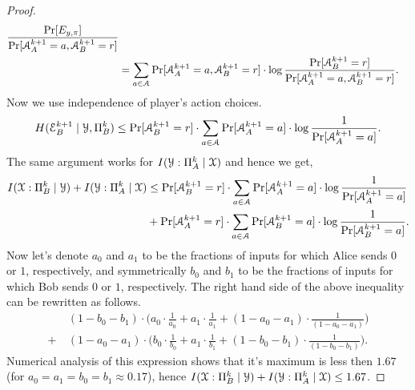 \begin{proof}
\begin{align*}
    \frac{\Pr[E_{y,\pi}]}{\Pr[\mathcal{A}^{k+1}_A = a , \mathcal{A}^{k+1}_B = r]}\\
    &= \sum_{a\in \mathcal{A}} 
    \Pr[\mathcal{A}^{k+1}_A = a , \mathcal{A}^{k+1}_B = r]\cdot \log 
    \frac{\Pr[\mathcal{A}^{k+1}_B = r]}{\Pr[\mathcal{A}^{k+1}_A = a , \mathcal{A}^{k+1}_B = r]}.
    \end{align*}
    Now we use independence of player's action choices.
    \begin{equation*}\label{eq:common-entropy-bound}
    H(\mathcal{E}^{k+1}_B\mid\mathcal{Y},\Pi^k_B)
    \le \Pr[\mathcal{A}^{k+1}_B = r] \cdot \sum_{a\in \mathcal{A}} 
    \Pr[\mathcal{A}^{k+1}_A = a] \cdot \log 
    \frac{1}{\Pr[\mathcal{A}^{k+1}_A = a]}.
    \end{equation*}
    The same argument works for $I(\mathcal{Y}:\Pi_A^k\mid\mathcal{X})$ and hence we get,
    \begin{align*}
    I(\mathcal{X}:\Pi_B^k\mid\mathcal{Y}) + I(\mathcal{Y}:\Pi_A^k\mid\mathcal{X})&\leq    
    \Pr[\mathcal{A}^{k+1}_B = r] \cdot \sum_{a\in \mathcal{A}} 
    \Pr[\mathcal{A}^{k+1}_A = a] \cdot \log 
    \frac{1}{\Pr[\mathcal{A}^{k+1}_A = a]} \\
    &+ 
    \Pr[\mathcal{A}^{k+1}_A = r] \cdot
    \sum_{a\in \mathcal{A}} 
    \Pr[\mathcal{A}^{k+1}_B = a] \cdot \log 
    \frac{1}{\Pr[\mathcal{A}^{k+1}_B = a]}.
    \end{align*}
    Now let's denote $a_0$ and $a_1$ to be the fractions of inputs for which Alice sends $0$ or $1$, respectively,
    and symmetrically $b_0$ and $b_1$ to be the fractions of inputs for which Bob sends $0$ or $1$, respectively.
    The right hand side of the above inequality can be rewritten as follows.
    \begin{align*}
    &(1 - b_0 - b_1) \cdot \Biggl( a_0\cdot\frac{1}{a_0} + a_1\cdot\frac{1}{a_1} + (1 - a_0 - a_1)\cdot\frac{1}{(1 - a_0 - a_1)} \Biggr)\\
    +\ &(1 - a_0 - a_1) \cdot \Biggl( b_0\cdot\frac{1}{b_0} + a_1\cdot\frac{1}{b_1} + (1 - b_0 - b_1)\cdot\frac{1}{(1 - b_0 - b_1)}\Biggr).
    \end{align*}
    Numerical analysis of this expression shows that it's maximum is less then $1.67$ (for $a_0 = a_1= b_0 = b_1 \approx 0.17$), hence $I(\mathcal{X}:\Pi_B^k\mid\mathcal{Y}) + I(\mathcal{Y}:\Pi_A^k\mid\mathcal{X})\leq 1.67$.
\end{proof}


